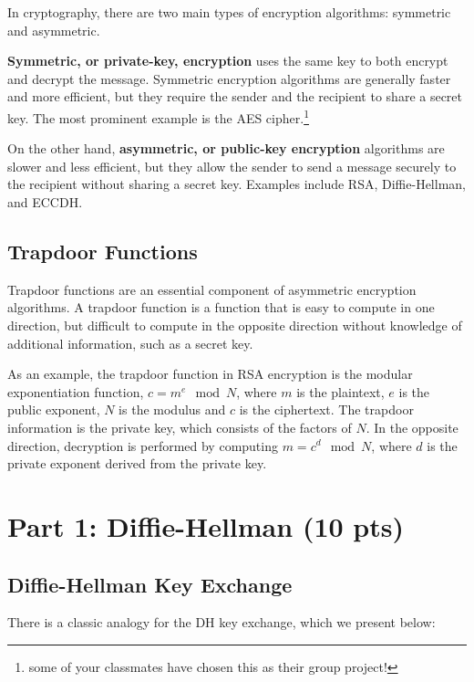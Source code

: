 \documentclass{article}
\begin{document}
    In cryptography, there are two main types of encryption algorithms: symmetric and asymmetric. 

    \vspace{3mm}
    \textbf{Symmetric, or private-key, encryption} uses the same key to both encrypt and decrypt the message. Symmetric encryption algorithms are generally faster and more efficient, but they require the sender and the recipient to share a secret key. The most prominent example is the AES cipher.\footnote{some of your classmates have chosen this as their group project!} 

    \vspace{3mm}
    On the other hand, \textbf{asymmetric, or public-key encryption} algorithms are slower and less efficient, but they allow the sender to send a message securely to the recipient without sharing a secret key. Examples include RSA, Diffie-Hellman, and ECCDH.

\subsection*{Trapdoor Functions}
    
    Trapdoor functions are an essential component of asymmetric encryption algorithms. A trapdoor function is a function that is easy to compute in one direction, but difficult to compute in the opposite direction without knowledge of additional information, such as a secret key.
    
    \vspace{2mm}
    As an example, the trapdoor function in RSA encryption is the modular exponentiation function, $c = m^e \mod N$, where $m$ is the plaintext, $e$ is the public exponent, $N$ is the modulus and $c$ is the ciphertext. The trapdoor information is the private key, which consists of the factors of $N$. In the opposite direction, decryption is performed by computing $m = c^d \mod N$, where $d$ is the private exponent derived from the private key.


\section*{Part 1: Diffie-Hellman (10 pts)}

\subsection*{Diffie-Hellman Key Exchange}

There is a classic analogy for the DH key exchange, which we present below: 
\end{document}
